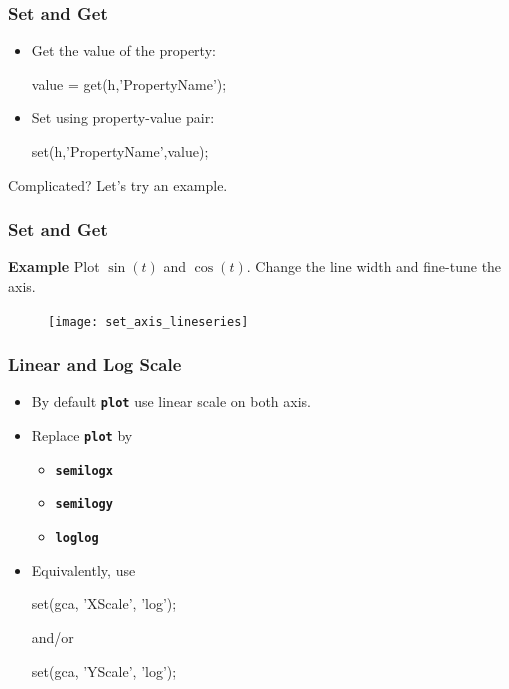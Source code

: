 \documentclass{beamer}  %
\newcommand{\tttbf}[1]{\texttt{\textbf{#1}}} %
\begin{document}
\begin{frame}[fragile]
\frametitle{Set and Get}
\begin{itemize}
    \item Get the value of the property:
          \begin{matlabcode}[frame=none]
          value = get(h,'PropertyName');
          \end{matlabcode}
          
    \item Set using property-value pair:
          \begin{matlabcode}[frame=none]
          set(h,'PropertyName',value);
          \end{matlabcode}
\end{itemize}
Complicated? Let's try an example.
\end{frame}
\begin{frame}[fragile]
\frametitle{Set and Get}
\textbf{Example} 
Plot $\sin(t)$ and $\cos(t)$. Change the line width and fine-tune the axis.
\setcounter{subfigure}{0}
\begin{figure}
    \centering
   \texttt{[image: set\_axis\_lineseries]}
\end{figure}

\end{frame}
\begin{frame}[fragile]
\frametitle{Linear and Log Scale}
\begin{itemize}[<+->]
    \item By default \tttbf{plot} use linear scale on both axis.
    
    \item Replace \tttbf{plot} by
    \begin{itemize}
        \item \tttbf{semilogx}
        \item \tttbf{semilogy}
        \item \tttbf{loglog}
    \end{itemize}        
    
    \item Equivalently, use 
          \begin{matlabcode}[numbers=none,frame=none]
          set(gca, 'XScale', 'log');
          \end{matlabcode}
          and/or
          \begin{matlabcode}[numbers=none,frame=none]
          set(gca, 'YScale', 'log');
          \end{matlabcode}
\end{itemize}

\end{frame}
\end{document}
